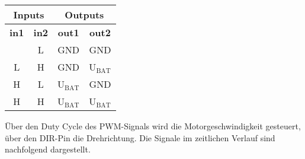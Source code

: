 \documentclass[12pt, a4paper]{report}
\begin{document}
            
            \begingroup
            \selectfont
            \setlength{\tabcolsep}{20pt}
            \begin{table}[H]
               \sffamily
               \centering
               \begin{tabular}{|cc|cc|}
               \hline
               \multicolumn{2}{|c|}{\textbf{Inputs}}             & \multicolumn{2}{c|}{\textbf{Outputs}}                        \\ \hline
               \multicolumn{1}{|c|}{\textbf{in1}} & \textbf{in2} & \multicolumn{1}{c|}{\textbf{out1}}      & \textbf{out2}      \\ \hhline{|=|=|=|=|}
               \multicolumn{1}{|c|}{L}            & L            & \multicolumn{1}{c|}{GND}                & GND                \\ \hline
               \multicolumn{1}{|c|}{L}            & H            & \multicolumn{1}{c|}{GND}                & U$_{\text{BAT}}$ \\ \hline
               \multicolumn{1}{|c|}{H}            & L            & \multicolumn{1}{c|}{U$_{\text{BAT}}$} & GND                \\ \hline
               \multicolumn{1}{|c|}{H}            & H            & \multicolumn{1}{c|}{U$_{\text{BAT}}$} & U$_{\text{BAT}}$ \\ \hline
               \end{tabular}
               \end{table}
            \endgroup
            Über den Duty Cycle des PWM-Signals wird die Motorgeschwindigkeit gesteuert, über den DIR-Pin die Drehrichtung. Die Signale im zeitlichen Verlauf sind nachfolgend dargestellt.
            
\end{document}
